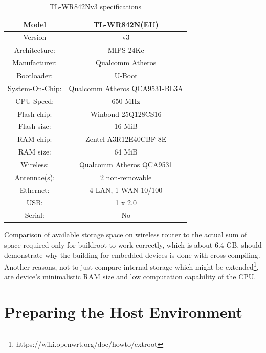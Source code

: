 \begin{table}[H]
\centering
\label{routerspec}
\begin{tabular}{c|c}
\hline
Model           &   TL-WR842N(EU)                   \\ \hline
Version         &   v3                              \\ \hline
Architecture:   &   MIPS 24Kc                       \\ \hline
Manufacturer:   &   Qualcomm Atheros                \\ \hline
Bootloader:     &   U-Boot                          \\ \hline
System-On-Chip: &   Qualcomm Atheros QCA9531-BL3A   \\ \hline
CPU Speed:      &   650 MHz                         \\ \hline
Flash chip:     &   Winbond 25Q128CS16              \\ \hline
Flash size:     &   16 MiB                          \\ \hline
RAM chip:       &   Zentel A3R12E40CBF-8E           \\ \hline
RAM size:       &   64 MiB                          \\ \hline
Wireless:       &   Qualcomm Atheros QCA9531        \\ \hline
Antennae(s):    &   2 non-removable                 \\ \hline
Ethernet:       &   4 LAN, 1 WAN 10/100             \\ \hline
USB:            &   1 x 2.0                         \\ \hline
Serial:         &   No                              \\ \hline
\end{tabular}
\caption{TL-WR842Nv3 specifications}
\end{table}

Comparison of available storage space on wireless router to the actual sum of space required only for buildroot to work correctly, which is about 6.4 GB, should demonstrate why the building for embedded devices is done with cross-compiling.
Another reasons, not to just compare internal storage which might be extended\footnote{https://wiki.openwrt.org/doc/howto/extroot}, are device's minimalistic RAM size and low computation capability of the CPU.



\section{Preparing the Host Environment}

